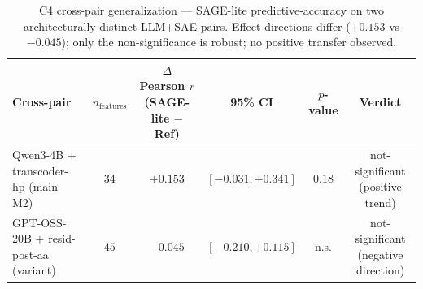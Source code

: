 \begin{table}[t]
\centering
\caption{C4 cross-pair generalization --- SAGE-lite predictive-accuracy on two architecturally distinct LLM+SAE pairs. Effect directions differ ($+0.153$ vs $-0.045$); only the non-significance is robust; no positive transfer observed.}
\label{tab:c4_crosspair}
\begin{tabular}{lccccc}
\toprule
Cross-pair & $n_{\text{features}}$ & $\Delta$ Pearson $r$ (SAGE-lite $-$ Ref) & 95\% CI & $p$-value & Verdict \\
\midrule
Qwen3-4B $+$ transcoder-hp (main M2) & $34$ & $+0.153$ & $[-0.031, +0.341]$ & $0.18$ & not-significant (positive trend) \\
GPT-OSS-20B $+$ resid-post-aa (variant) & $45$ & $-0.045$ & $[-0.210, +0.115]$ & n.s. & not-significant (negative direction) \\
\bottomrule
\end{tabular}
\end{table}
